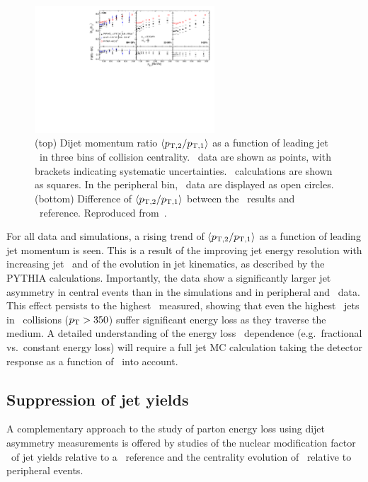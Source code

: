\begin{figure}[!th]
\begin{center}
\includegraphics[width=0.6\textwidth]{jetfigures/deltaPtOverPt5_lead120_sub30_diff_20120103.pdf}
\caption{(top) Dijet momentum ratio $\langle p_{\rm{T},2}/p_{\rm{T},1} \rangle$ as a function of
leading jet \pT\ in three bins of collision centrality.
\PbPb\ data are shown as points, with brackets indicating systematic uncertainties.  
\PYTHYD\ calculations are shown as squares. In the peripheral bin,
\pp\ data are displayed as open circles.
(bottom) Difference of $\langle p_{\rm{T},2}/p_{\rm{T},1} \rangle$ between the \PbPb\ results and \PYTHYD\ reference.
Reproduced from~\cite{CMS_dijet}.}
\label{fig:GR:CMS_pt_ratio}
\end{center}
\end{figure}

For all data and simulations, a rising trend of $\langle p_{\rm{T},2}/p_{\rm{T},1} \rangle$ as a function
of leading jet momentum is seen. This is a result of the improving jet energy resolution
with increasing jet \pT\ and of the evolution in jet kinematics, as described by the PYTHIA
calculations. Importantly, the data show a significantly larger jet asymmetry in central events
than in the simulations and in peripheral and \pp\ data. This effect persists to the
highest \pT\ measured, showing that even the highest \pT\ jets in \PbPb\ collisions ($\mbox{$p_{\mathrm{T}}$} > 350$\GeVc)
suffer significant energy loss as they traverse the medium. A detailed understanding of the energy loss
\pT\ dependence (e.g.\ fractional vs.\ constant energy loss) will require a full jet MC calculation
taking the detector response as a function of \pT\ into account.

\subsection{Suppression of jet yields}

A complementary approach to the study of parton energy loss using dijet asymmetry measurements
is offered by studies of the nuclear modification factor \Raa\ of jet yields relative
to a \pp\ reference and the centrality evolution of \Rcp\ relative to peripheral events.

